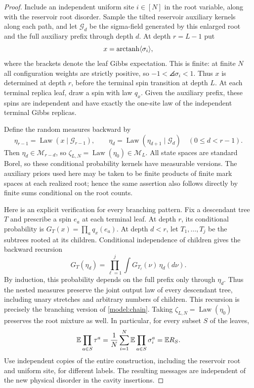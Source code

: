 \begin{proof}
Include an independent uniform site $i\in[N]$ in the root variable, along
with the reservoir root disorder. Sample the tilted reservoir auxiliary
kernels along each path, and let $\mathscr G_d$ be the sigma-field generated
by this enlarged root and the full auxiliary prefix through depth $d$.
At depth $r=L-1$ put
\[
 x=\operatorname{arctanh}\langle\sigma_i\rangle,
\]
where the brackets denote the leaf Gibbs expectation. This is finite:
at finite $N$ all configuration weights are strictly positive, so
$-1<\angles{\sigma_i}<1$.
Thus $x$ is determined at depth $r$, before the terminal spin transition
at depth $L$. At each terminal replica leaf, draw a spin with law $q_x$. Given the
auxiliary prefix, these spins are independent and have exactly the
one-site law of the independent terminal Gibbs replicas.

Define the random measures backward by
\[
 \eta_{r-1}=\operatorname{Law}(x\mid\mathscr G_{r-1}),\qquad
 \eta_d=\operatorname{Law}(\eta_{d+1}\mid\mathscr G_d)
 \quad(0\le d<r-1).
\]
Then $\eta_d\in\mathcal M_{r-d}$, so
$\zeta_{L,N}=\operatorname{Law}(\eta_0)\in\mathcal M_L$.
All state spaces are standard
Borel, so these conditional probability kernels have measurable versions.
The auxiliary priors used here may be taken to be finite products of finite
mark spaces at each realized root; hence the same assertion also follows
directly by finite sums conditional on the root counts.

Here is an explicit verification for every branching pattern. Fix a
descendant tree $T$ and prescribe a spin $e_a$ at each terminal leaf.
At depth $r$, its conditional probability is
$G_T(x)=\prod_a q_x(e_a)$. At depth $d<r$, let $T_1,\ldots,T_j$ be
the subtrees rooted at its children. Conditional independence of children
gives the backward recursion
\[
 G_T(\eta_d)=\prod_{\ell=1}^j
       \int G_{T_\ell}(\nu)\,\eta_d(d\nu).
\]
By induction, this probability depends on the full prefix only through
$\eta_d$. Thus the nested measures preserve the joint output law of every
descendant tree, including unary stretches and arbitrary numbers of
children. This recursion is precisely the branching version of
\eqref{model:chain}. Taking $\zeta_{L,N}=\operatorname{Law}(\eta_0)$
preserves the root mixture as well. In particular, for every subset $S$
of the leaves,
\begin{equation}\label{comp:single-label-moments}
 \mathbb E\prod_{a\in S}\tau^a
 =\frac1N\sum_{i=1}^N\mathbb E\prod_{a\in S}\sigma_i^a
 =\mathbb E R_S.
\end{equation}
Use independent copies of the entire construction, including the reservoir
root and uniform site, for different labels. The resulting messages are
independent of the new physical disorder in the cavity insertions.
\end{proof}

